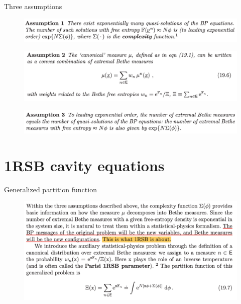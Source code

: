 \documentclass[UTF8]{beamer}
\begin{document}
\begin{frame}{Three assumptions}
  \begin{minipage}[c]{0.9\linewidth}
    \begin{figure}
      \centering
      \includegraphics[width=0.9\linewidth]{./fig/Assume_1.png}
    \end{figure}
  \end{minipage}
  \vfill
  \begin{minipage}[c]{0.9\linewidth}
    \begin{figure}
      \centering
      \includegraphics[width=0.9\linewidth]{./fig/Assume_2.png}
    \end{figure}
  \end{minipage}
  \vfill
  \begin{minipage}[c]{0.9\linewidth}
    \begin{figure}
      \centering
      \includegraphics[width=0.9\linewidth]{./fig/Assume_3.png}
    \end{figure}
  \end{minipage}
\end{frame}


\section{1RSB cavity equations}

\begin{frame}{Generalized partition function}
  \begin{figure}
    \centering
    \includegraphics[width=0.9\linewidth]{./fig/Eq_197.png}
  \end{figure}
\end{frame}
\end{document}
